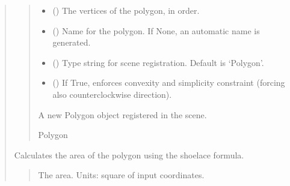 \documentclass[letterpaper,10pt,english]{sphinxmanual}
\begin{document}
\begin{quote}
\begin{fulllineitems}
\begin{quote}
\begin{description}
\begin{itemize}
\item {} 
\sphinxAtStartPar
{} () \textendash{} The vertices of the polygon, in order.

\item {} 
\sphinxAtStartPar
{} (\sphinxstyleliteralemphasis{\sphinxupquote{, }}) \textendash{} Name for the polygon. If None, an automatic name is generated.

\item {} 
\sphinxAtStartPar
{} (\sphinxstyleliteralemphasis{\sphinxupquote{, }}) \textendash{} Type string for scene registration. Default is ‘Polygon’.

\item {} 
\sphinxAtStartPar
{} (\sphinxstyleliteralemphasis{\sphinxupquote{, }}) \textendash{} If True, enforces convexity and simplicity constraint (forcing also counterclockwise direction).

\end{itemize}

\sphinxAtStartPar
A new Polygon object registered in the scene.

\sphinxAtStartPar
Polygon

\end{description}\end{quote}

\begin{fulllineitems}
\label{\detokenize{pygeox:pygeox.custom_objects.Polygon.area}}
\pysigstartsignatures
\pysigline
{}
\pysigstopsignatures
\sphinxAtStartPar
Calculates the area of the polygon using the shoelace formula.
\begin{quote}\begin{description}
\sphinxAtStartPar
The area. Units: square of input coordinates.


\end{description}
\end{quote}
\end{fulllineitems}
\end{fulllineitems}
\end{quote}
\end{document}
